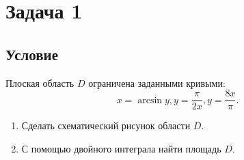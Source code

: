 \documentclass[12pt]{article}
\begin{document}
	\section*{Задача 1}	
	\subsection*{Условие}
	
	Плоская область $D$ ограничена заданными кривыми: $$x=\arcsin y, y=\frac{\pi}{2x}, y=\frac{8x}{\pi}.$$
	
	\begin{enumerate}
		\item Сделать схематический рисунок области $D$.
		\item С помощью двойного интеграла найти площадь $D$.		
	\end{enumerate}
\end{document}
